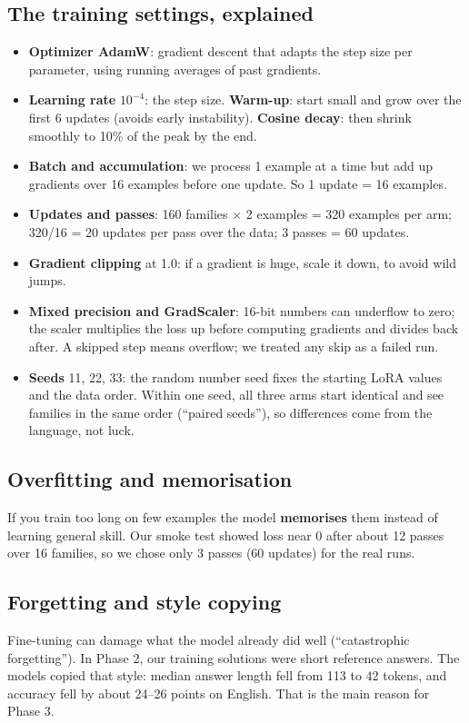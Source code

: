 \documentclass[11pt,a4paper]{article}
\begin{document}
\subsection{The training settings, explained}
\begin{itemize}
\item \textbf{Optimizer AdamW}: gradient descent that adapts the step size per parameter, using running averages of past gradients.
\item \textbf{Learning rate} $10^{-4}$: the step size. \textbf{Warm-up}: start small and grow over the first 6 updates (avoids early instability). \textbf{Cosine decay}: then shrink smoothly to 10\% of the peak by the end.
\item \textbf{Batch and accumulation}: we process 1 example at a time but add up gradients over 16 examples before one update. So 1 update = 16 examples.
\item \textbf{Updates and passes}: 160 families $\times$ 2 examples = 320 examples per arm; 320/16 = 20 updates per pass over the data; 3 passes = 60 updates.
\item \textbf{Gradient clipping} at 1.0: if a gradient is huge, scale it down, to avoid wild jumps.
\item \textbf{Mixed precision and GradScaler}: 16-bit numbers can underflow to zero; the scaler multiplies the loss up before computing gradients and divides back after. A skipped step means overflow; we treated any skip as a failed run.
\item \textbf{Seeds} 11, 22, 33: the random number seed fixes the starting LoRA values and the data order. Within one seed, all three arms start identical and see families in the same order (``paired seeds''), so differences come from the language, not luck.
\end{itemize}

\subsection{Overfitting and memorisation}
If you train too long on few examples the model \textbf{memorises} them instead of learning general skill. Our smoke test showed loss near 0 after about 12 passes over 16 families, so we chose only 3 passes (60 updates) for the real runs.

\subsection{Forgetting and style copying}
Fine-tuning can damage what the model already did well (``catastrophic forgetting''). In Phase 2, our training solutions were short reference answers. The models copied that style: median answer length fell from 113 to 42 tokens, and accuracy fell by about 24--26 points on English. That is the main reason for Phase 3.
\end{document}
